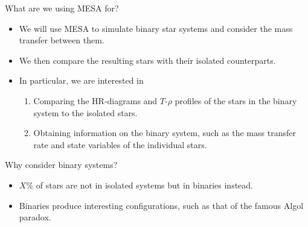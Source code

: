 \documentclass{beamer}
\begin{document}
%
\begin{frame}{What are we using MESA for?}
    \begin{itemize}
        \item<1-> We will use MESA to simulate \alert{binary star systems} and consider the \alert{mass transfer} between them.
        \item<2-> We then compare the resulting stars with their isolated counterparts.
        \item<3-> In particular, we are interested  in 
        \begin{enumerate}
            \item<4-> Comparing the \alert{HR-diagrams} and \alert{ $T$-$\rho$ profiles} of the stars in the binary system to the isolated stars.
            \item<5-> Obtaining information on the binary system, such as the \alert{mass transfer rate} and \alert{state variables} of the individual stars.
        \end{enumerate}
    \end{itemize}
\end{frame}

\begin{frame}{Why consider binary systems?}
    \begin{itemize}
        \item<1-> \alert{$X\%$} of stars are not in isolated systems but in binaries instead.
        \item<2-> Binaries produce interesting configurations, such as that of the famous \alert{Algol paradox}.
    \end{itemize}
\end{frame}
\end{document}

